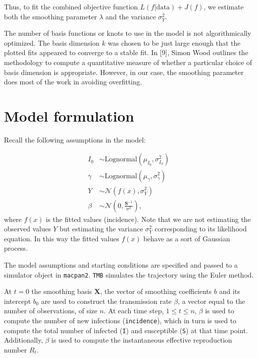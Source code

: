 \documentclass[
11pt, %
oneside, %
english, %
singlespacing, %
]{macthesis} %
\begin{document}
Thus, to fit the combined objective function \(L(f|\text{data}) + J(f)\), we estimate both the smoothing parameter \(\lambda\) and the variance \(\sigma^2_Y\).

The number of basis functions or knots to use in the model is not algorithmically optimized. The basis dimension \(k\) was chosen to be just large enough that the plotted fits appeared to converge to a stable fit. In {[}9{]}, Simon Wood outlines the methodology to compute a quantitative measure of whether a particular choice of basis dimension is appropriate. However, in our case, the smoothing parameter does most of the work in avoiding overfitting.

\section{Model formulation}\label{Model-formulation}

Recall the following assumptions in the model:

\[
\begin{aligned}
I_0 &\sim \text{Lognormal}(\mu_{I_0}, \sigma^2_{I_0}) \\
\gamma &\sim \text{Lognormal}(\mu_{\gamma}, \sigma^2_{\gamma}) \\
Y &\sim \mathcal{N}(f(x), \sigma^2_Y) \\
\beta &\sim \mathcal{N}(0, \frac{\mathbf{S}^{-1}}{\sigma^2}),
\end{aligned}
\]
where \(f(x)\) is the fitted values (incidence). Note that
we are not estimating the observed values \(Y\) but estimating the variance \(\sigma^2_Y\) corresponding to its likelihood equation. In this way the fitted values \(f(x)\) behave as a sort of Gaussian process.

The model assumptions and starting conditions are specified and passed to a simulator object in \texttt{macpan2}. \texttt{TMB} simulates the trajectory using the Euler method.

At \(t= 0\) the smoothing basis \(\mathbf{X}\), the vector of smoothing coefficients \(b\) and its intercept \(b_0\) are used to construct the transmission rate \(\beta\), a vector equal to the number of observations, of size \(n\). At each time step, \(1 \leq t \leq n\), \(\beta\) is used to compute the number of new infections (\texttt{incidence}), which in turn is used to compute the total number of infected (\texttt{I}) and susceptible (\texttt{S}) at that time point. Additionally, \(\beta\) is used to compute the instantaneous effective reproduction number \(R_t\).
\end{document}
